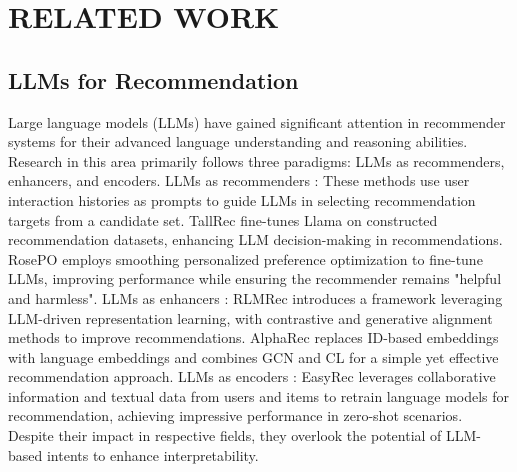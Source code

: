 \section{RELATED WORK}
\subsection{LLMs for Recommendation}
Large language models (LLMs) have gained significant attention in recommender systems for their advanced language understanding and reasoning abilities. Research in this area primarily follows three paradigms: LLMs as recommenders, enhancers, and encoders. LLMs as recommenders \citep{2024llara, 2023llamarec}: These methods use user interaction histories as prompts to guide LLMs in selecting recommendation targets from a candidate set. TallRec \citep{2023tallrec} fine-tunes Llama on constructed recommendation datasets, enhancing LLM decision-making in recommendations. RosePO \citep{2024rosepo} employs smoothing personalized preference optimization to fine-tune LLMs, improving performance while ensuring the recommender remains "helpful and harmless". LLMs as enhancers \citep{2024DALR, 2023VQ-Rec}: RLMRec \citep{2024rlmrec} introduces a framework leveraging LLM-driven representation learning, with contrastive and generative alignment methods to improve recommendations. AlphaRec \citep{2024alpharec} replaces ID-based embeddings with language embeddings and combines GCN and CL for a simple yet effective recommendation approach. LLMs as encoders \citep{2023chatrec, 2024BLaIR}: EasyRec \citep{2024easyrec} leverages collaborative information and textual data from users and items to retrain language models for recommendation, achieving impressive performance in zero-shot scenarios. Despite their impact in respective fields, they overlook the potential of LLM-based intents to enhance interpretability.

